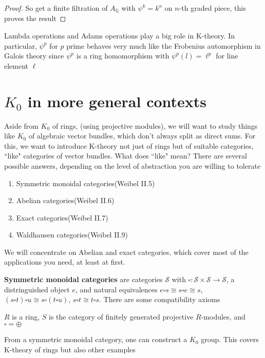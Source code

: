 \documentclass[main]{subfiles}
\begin{document}
\begin{proof}
So get a finite filtration of $A_{\mathbb Q}$ with $\psi^k=k^n$ on $n$-th graded piece, this proves the result
\end{proof}

Lambda operations and Adams operations play a big role in K-theory. In particular, $\psi^p$ for $p$ prime behaves very much like the Frobenius automorphism in Galois theory since $\psi^p$ is a ring homomorphism with $\psi^p(l)=\ell^p$ for line element $\ell$

\section{$K_0$ in more general contexts}

Aside from $K_0$ of rings, (using projective modules), we will want to study things like $K_0$ of algebraic vector bundles, which don't always split as direct sums. For this, we want to introduce K-theory not just of rings but of suitable categories, ``like" categories of vector bundles. What does ``like" mean? There are several possible answers, depending on the level of abstraction you are willing to tolerate
\begin{enumerate}[label=\alph*)]
\item Symmetric monoidal categories(Weibel II.5)
\item Abelian categories(Weibel II.6)
\item Exact categories(Weibel II.7)
\item Waldhausen categories(Weibel II.9)
\end{enumerate}

We will concentrate on Abelian and exact categories, which cover most of the applications you need, at least at first.

\textbf{Symmetric monoidal categories} are categories $\mathcal S$ with $\square:\mathcal S\times\mathcal S\to\mathcal S$, a distringuished object $e$, and natural equivalences $e\square s\cong s\square e\cong s$, $(s\square t)\square u\cong s\square (t\square u)$, $s\square t\cong t\square s$. There are some compatibility axioms

\begin{example}
$R$ is a ring, $S$ is the category of finitely generated projective $R$-modules, and $\square=\oplus$
\end{example}

From a symmetric monoidal category, one can construct a $K_0$ group. This covers K-theory of rings but also other examples
\end{document}
